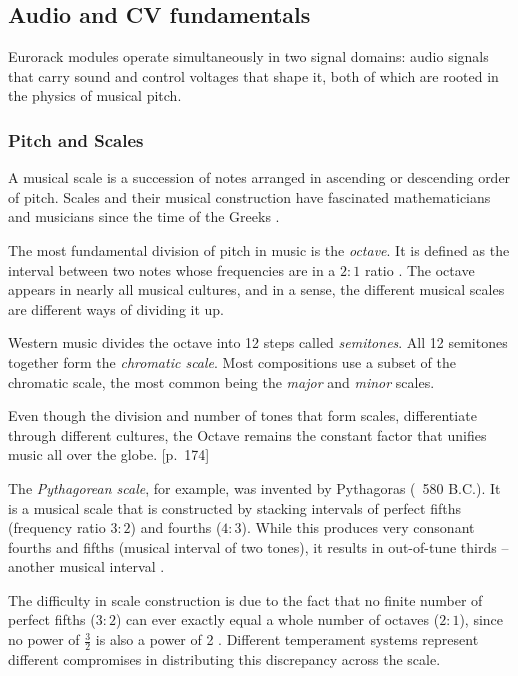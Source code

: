 \newpage
\subsection{Audio and CV fundamentals}
\label{sec:audio-cv-fundamentals}

Eurorack modules operate simultaneously in two signal domains: audio signals that carry sound and control voltages that shape it, both of which are rooted in the physics of musical pitch.

\subsubsection{Pitch and Scales}
\label{sec:pitch-and-scales}

A musical scale is a succession of notes arranged in ascending or descending order 
of pitch. 
Scales and their musical construction have fascinated mathematicians and musicians since the time of the Greeks \cite[p.~174]{wheelerScienceSound2014}.

The most fundamental division of pitch in music is the \textit{octave}.
It is defined as the interval between two notes whose frequencies are in a $2:1$ ratio \cite[p.~89]{wheelerScienceSound2014}. 
The octave appears in nearly all musical cultures, and in a sense, the different musical scales are different ways of dividing it up.

Western music divides the octave into 12 steps called \textit{semitones}. 
All 12 semitones together form the \textit{chromatic scale}. 
Most compositions use a subset of the chromatic scale, the most common being the \textit{major} and \textit{minor} scales.

Even though the division and number of tones that form scales, differentiate through different cultures, the Octave remains the constant factor that unifies music all over the globe. [p.~174]\cite{wheelerScienceSound2014}

The \textit{Pythagorean scale}, for example, was invented by Pythagoras (~580 B.C.). 
It is a musical scale that  is constructed by stacking intervals of perfect fifths (frequency ratio $3:2$) and fourths ($4:3$). 
While this produces very consonant fourths and fifths (musical interval of two tones), it results in out-of-tune thirds -- another musical interval \cite[p.~176]{wheelerScienceSound2014}.

The difficulty in scale construction is due to the fact that no finite number of perfect fifths ($3:2$) can ever exactly equal a whole number of octaves ($2:1$), since no power of $\frac{3}{2}$ is also a power of 2 \cite[p.~180]{wheelerScienceSound2014}. 
Different temperament systems represent different compromises in distributing this discrepancy across the scale.

